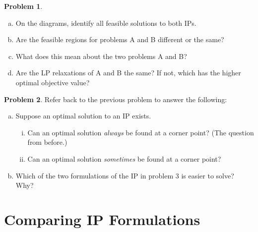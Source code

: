 \documentclass[11pt]{article}
\theoremstyle{definition}
\newtheorem{problem}{Problem}
\newcommand{\answerbox}[3]{%
  \fbox{%
    \begin{minipage}[#1]{#2}
      \hfill\vspace{#3}
    \end{minipage}
  }
}
\newcommand{\answerboxone}[2]{%
  \answerbox{#1}{6.0in}{#2} 
}
\newcommand{\answerboxtwo}[2]{%
  \answerbox{#1}{5.8in}{#2}
}
\newcommand{\wordbox}{\answerbox{c}{1.2in}{.7cm}}
\begin{document}
\begin{problem}
\begin{enumerate}[(a)]
   \item On the diagrams, identify all feasible solutions to both IPs. 
   \item Are the feasible regions for problems A and B different or the same?  \wordbox
   \item What does this mean about the two problems A and B? 
   
   \answerboxone{c}{.6in}
   \item Are the LP relaxations of A and B the same?  If not, which has the higher optimal objective value?
   
   \answerboxone{c}{.5in}
\end{enumerate}
\end{problem}


\newpage

\begin{problem}
Refer back to the previous problem to answer the following:
\begin{enumerate}[(a)]
\item  Suppose an optimal solution to an IP exists.
\begin{enumerate}[i.]
\item Can an optimal solution \emph{always} be found at a corner point?  (The question from before.)

\answerboxtwo{c}{.5in}

\item Can an optimal solution \emph{sometimes} be found at a corner point?  
 
\answerboxtwo{c}{.5in}
\end{enumerate}
\item Which of the two formulations of the IP in problem 3 is easier to solve?  Why?

\answerboxone{c}{1in}

\end{enumerate}
\end{problem}

\vfill
\section{Comparing IP Formulations}
\end{document}
